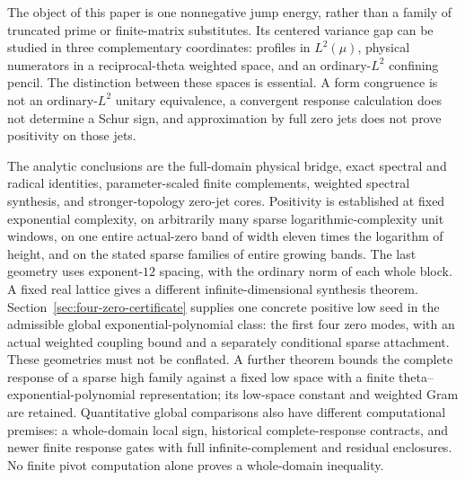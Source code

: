 \documentclass[11pt,a4paper]{article}
\numberwithin{equation}{section}
\theoremstyle{definition}\newtheorem{definition}[theorem]{Definition}
\theoremstyle{remark}\newtheorem{remark}[theorem]{Remark}
\begin{document}
The object of this paper is one nonnegative jump energy, rather than a family of truncated prime or finite-matrix substitutes. Its centered variance gap can be studied in three complementary coordinates: profiles in $L^2(\mu)$, physical numerators in a reciprocal-theta weighted space, and an ordinary-$L^2$ confining pencil. The distinction between these spaces is essential. A form congruence is not an ordinary-$L^2$ unitary equivalence, a convergent response calculation does not determine a Schur sign, and approximation by full zero jets does not prove positivity on those jets.

The analytic conclusions are the full-domain physical bridge, exact spectral and radical identities, parameter-scaled finite complements, weighted spectral synthesis, and stronger-topology zero-jet cores. Positivity is established at fixed exponential complexity, on arbitrarily many sparse logarithmic-complexity unit windows, on one entire actual-zero band of width eleven times the logarithm of height, and on the stated sparse families of entire growing bands. The last geometry uses exponent-$12$ spacing, with the ordinary norm of each whole block. A fixed real lattice gives a different infinite-dimensional synthesis theorem. Section~\ref{sec:four-zero-certificate} supplies one concrete positive low seed in the admissible global exponential-polynomial class: the first four zero modes, with an actual weighted coupling bound and a separately conditional sparse attachment. These geometries must not be conflated. A further theorem bounds the complete response of a sparse high family against a fixed low space with a finite theta--exponential-polynomial representation; its low-space constant and weighted Gram are retained. Quantitative global comparisons also have different computational premises: a whole-domain local sign, historical complete-response contracts, and newer finite response gates with full infinite-complement and residual enclosures. No finite pivot computation alone proves a whole-domain inequality.
\end{document}
